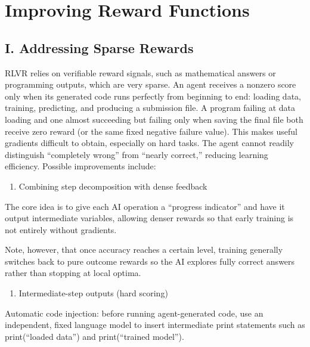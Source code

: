 \setcounter{section}{4}

\hypertarget{improving-reward-functions}{%
\section{Improving Reward Functions}\label{improving-reward-functions}}

\hypertarget{i.-addressing-sparse-rewards}{%
\subsection{I. Addressing Sparse Rewards}\label{i.-addressing-sparse-rewards}}

RLVR relies on verifiable reward signals, such as mathematical answers or programming outputs, which are very sparse. An agent receives a nonzero score only when its generated code runs perfectly from beginning to end: loading data, training, predicting, and producing a submission file. A program failing at data loading and one almost succeeding but failing only when saving the final file both receive zero reward (or the same fixed negative failure value). This makes useful gradients difficult to obtain, especially on hard tasks. The agent cannot readily distinguish ``completely wrong'' from ``nearly correct,'' reducing learning efficiency. Possible improvements include:

\begin{enumerate}
\def\labelenumi{\arabic{enumi}.}
\tightlist
\item
  Combining step decomposition with dense feedback
\end{enumerate}

The core idea is to give each AI operation a ``progress indicator'' and have it output intermediate variables, allowing denser rewards so that early training is not entirely without gradients.

Note, however, that once accuracy reaches a certain level, training generally switches back to pure outcome rewards so the AI explores fully correct answers rather than stopping at local optima.

\begin{enumerate}
\def\labelenumi{(\arabic{enumi})}
\tightlist
\item
  Intermediate-step outputs (hard scoring)
\end{enumerate}

Automatic code injection: before running agent-generated code, use an independent, fixed language model to insert intermediate print statements such as print(``loaded data'') and print(``trained model'').

